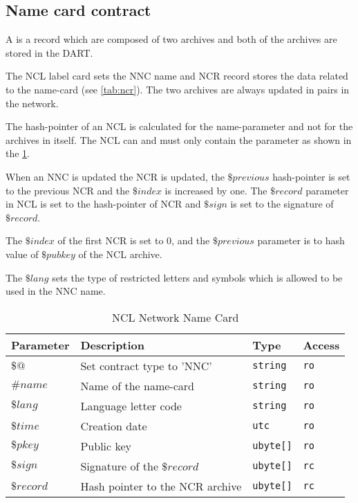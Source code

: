 \subsection{Name card contract} \label{sec:name_card_contract}
A  is a record which are composed of two archives  and  both of the archives are stored in the DART.

The NCL label card sets the NNC name and NCR record stores the data related to the name-card (see \cref{tab:ncr}). The two archives are always updated in pairs in the network.

The hash-pointer of an NCL is calculated for the name-parameter and not for the archives in itself. The NCL can and must only contain the parameter as shown in the  \cref{tab:ncl}.

When an NNC is updated the NCR is updated, the $\$previous$ hash-pointer is set to the previous NCR and the $\$index$ is increased by one. The $\$record$ parameter in NCL is set to the hash-pointer of NCR and $\$sign$ is set to the signature of $\$record$.

The $\$index$ of the first NCR is set to $0$, and the $\$previous$ parameter is to hash value of $\$pubkey$ of the NCL archive.

The $\$lang$ sets the type of restricted letters and symbols which is allowed to be used in the NNC name.


\begin{table}[H]
\begin{center}
\begin{tabular}{|l|p{7cm}|p{1.5cm}|l|}
      \hline
      Parameter & Description & Type & Access \\
      \hline
      $\$@$ & Set contract type to 'NNC' & \texttt{string} & \texttt{ro} \\
      \hline
      $\#name$ & Name of the name-card & \texttt{string} & \texttt{ro} \\
      \hline
      $\$lang$ & Language letter code & \texttt{string} & \texttt{ro} \\
      \hline
      $\$time$ & Creation date & \texttt{utc} & \texttt{ro} \\
      \hline
      $\$pkey$ & Public key & \texttt{ubyte[]} & \texttt{ro} \\
      \hline
      $\$sign$ & Signature of the $\$record$ & \texttt{ubyte[]} & \texttt{rc} \\
      \hline
      $\$record$ & Hash pointer to the NCR archive & \texttt{ubyte[]} & \texttt{rc} \\
      \hline
  \end{tabular}
\end{center}
\caption{NCL Network Name Card} 
\label{tab:ncl}
\end{table}


